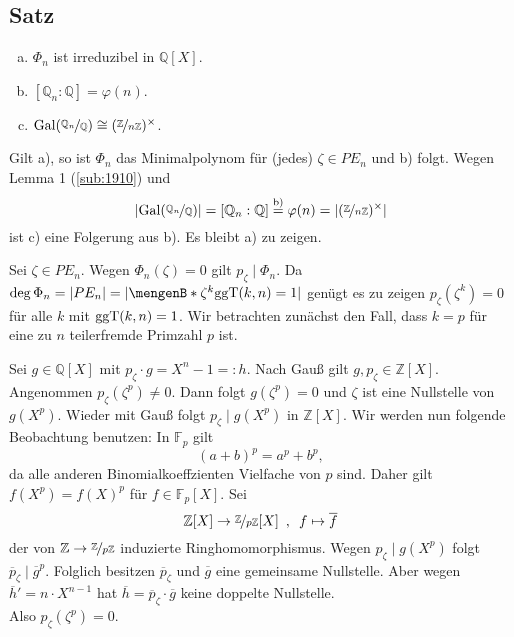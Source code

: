 \subsection[{Satz: $\Phi_n$ ist irreduzibel in $\mathds{Q}[X]$, $[\mathds{Q}_n :\mathds{Q}] = \varphi(n)$}]{Satz} %
\label{sub:1914}
\begin{enumerate}[a)]
	\item $\Phi_n$ ist irreduzibel in $\mathds{Q}[X]$.
	\item $[\mathds{Q}_n : \mathds{Q}] = \varphi(n)$.
	\item $\Gal(\nicefrac{\mathds{Q}_n}{\mathds{Q}}) \cong (\nicefrac{\mathds{Z}}{n \mathds{Z}})^\times$.
\end{enumerate}
Gilt a), so ist $\Phi_n$ das Minimalpolynom für (jedes) $\zeta \in PE_n$ und b) folgt. Wegen Lemma 1 (\ref{sub:1910}) und 
\[
	\abs{\Gal(\nicefrac{\mathds{Q}_n}{\mathds{Q}})} = [\mathds{Q}_n : \mathds{Q}] \stackrel{\text{b)}}{=} \varphi(n) = \abs{ (\nicefrac{\mathds{Z}}{n \mathds{Z}})^\times}  
\]
ist c) eine Folgerung aus b). Es bleibt a) zu zeigen. 

Sei $\zeta \in PE_n$. Wegen $\Phi_n(\zeta) =0$ gilt $p_\zeta \mid \Phi_n$. Da $\deg \Phi_n = \abs{PE_n} = \abs{\set[\zeta^k]{\ggT(k,n)=1} }  $ genügt es zu zeigen
$p_\zeta (\zeta^k)=0$ für alle $k$ mit $\ggT(k,n)=1$. Wir betrachten zunächst den Fall, dass $k=p$ für eine zu $n$ teilerfremde Primzahl $p$ ist.

Sei $g \in \mathds{Q}[X]$ mit $p_\zeta \cdot g = X^n-1 =: h$. Nach Gauß gilt $g , p_\zeta \in \mathds{Z}[X]$. Angenommen $p_\zeta (\zeta^p) \not= 0$. Dann folgt
$g(\zeta^p)=0$ und $\zeta$ ist eine Nullstelle von $g(X^p)$. Wieder mit Gauß folgt $p_\zeta \mid g(X^p)$ in $\mathds{Z}[X]$. Wir werden nun folgende Beobachtung benutzen:
In $\mathds{F}_p$ gilt 
\[
	(a+b)^p = a^p + b^p,
\]
da alle anderen Binomialkoeffzienten Vielfache von $p$ sind. Daher gilt $f(X^p) = f(X)^p$ für $f \in \mathds{F}_p[X]$. Sei
\[
	\mathds{Z}[X] \to \nicefrac{\mathds{Z}}{p \mathds{Z}}[X] \enspace, \enspace f \mapsto \overline{f} 
\]
der von $\mathds{Z} \to \nicefrac{\mathds{Z}}{p \mathds{Z}}$ induzierte Ringhomomorphismus. Wegen $p_\zeta \mid g(X^p)$ folgt $\overline{p}_\zeta \mid \overline{g}^p  $.
Folglich besitzen $\overline{p}_\zeta $ und $\overline{g}$ eine gemeinsame Nullstelle. Aber wegen $\overline{h}' = n \cdot X^{n-1} $ hat 
$\overline{h} = \overline{p}_\zeta \cdot \overline{g}$ keine doppelte Nullstelle. \light \\
Also $p_\zeta( \zeta^p)=0$.

